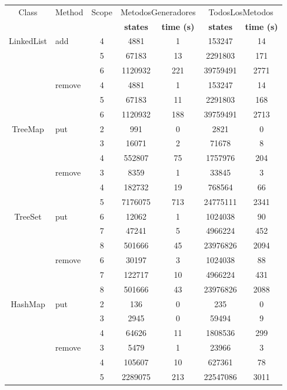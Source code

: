 \begin{table}[H]
\scriptsize
\centering
\begin{tabular}{ c| l| c c c c c}
\hline
Class & Method & Scope &
\multicolumn{2}{c}{\textsf{MetodosGeneradores}} &
\multicolumn{2}{c}{\textsf{TodosLosMetodos}} \\
&&&
\tiny{\textbf{states}} & \tiny{\textbf{time (s)}} &
\tiny{\textbf{states}} & \tiny{\textbf{time (s)}}\\
\hline
\multirow{6}{*}{LinkedList} 
& add
& 4 & 4881  & 1 & 153247  & 14  \\
& & 5 & 67183 & 13  & 2291803 & 171 \\
& & 6 & 1120932 & 221 & 39759491  & 2771  \\
\cline{2-7}
& remove 
& 4 & 4881  & 1 & 153247  & 14\\
& & 5 & 67183 & 11  & 2291803 & 168\\
& & 6 & 1120932 & 188 & 39759491  & 2713\\
\hline

\multirow{6}{*}{TreeMap} 
& put
 & 2 & 991 & 0 & 2821  & 0 \\
& & 3 & 16071 & 2 & 71678 & 8 \\
& & 4 & 552807  & 75  & 1757976 & 204 \\
\cline{2-7}
& remove
 & 3 & 8359  & 1 & 33845 & 3 \\
& & 4 & 182732  & 19  & 768564  & 66  \\
& & 5 & 7176075 & 713 & 24775111  & 2341  \\
\hline

\multirow{6}{*}{TreeSet} 
& put
& 6 & 12062 & 1 & 1024038 & 90  \\
& & 7 & 47241 & 5 & 4966224 & 452 \\
& & 8 & 501666  & 45  & 23976826  & 2094  \\
\cline{2-7}
& remove
& 6 & 30197 & 3 & 1024038 & 88  \\
& & 7 & 122717  & 10  & 4966224 & 431 \\
& & 8 & 501666  & 43  & 23976826  & 2088  \\
\hline
\multirow{6}{*}{HashMap} 
& put
 & 2 & 136& 0& 235 & 0 \\
& & 3 & 2945& 0& 59494 & 9 \\
& & 4 & 64626& 11&  1808536& 299 \\
\cline{2-7}
& remove
& 3 & 5479& 1& 23966 & 3 \\
& & 4 & 105607& 10& 627361 &  78\\
& & 5 & 2289075& 213& 22547086 &3011  \\
\hline


\end{tabular}
\end{table}
